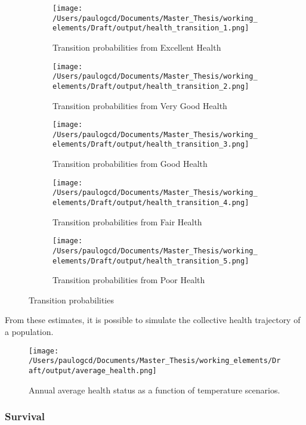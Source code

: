 \documentclass{article}
\begin{document}
\begin{figure}[H]
    \begin{subfigure}{.5\textwidth}
    \centering
    \texttt{[image: /Users/paulogcd/Documents/Master\_Thesis/working\_elements/Draft/output/health\_transition\_1.png]}
    \caption{Transition probabilities from Excellent Health}
    \label{fig:sfig1}
    \end{subfigure}%
    \begin{subfigure}{.5\textwidth}
    \centering
    \texttt{[image: /Users/paulogcd/Documents/Master\_Thesis/working\_elements/Draft/output/health\_transition\_2.png]}
    \caption{Transition probabilities from Very Good Health}
    \label{fig:sfig2}
    \end{subfigure}
    \begin{subfigure}{.5\textwidth}
    \centering
    \texttt{[image: /Users/paulogcd/Documents/Master\_Thesis/working\_elements/Draft/output/health\_transition\_3.png]}
    \caption{Transition probabilities from Good Health}
    \label{fig:sfig3}
    \end{subfigure}
    \begin{subfigure}{.5\textwidth}
    \centering
    \texttt{[image: /Users/paulogcd/Documents/Master\_Thesis/working\_elements/Draft/output/health\_transition\_4.png]}
    \caption{Transition probabilities from Fair Health}
    \label{fig:sfig4}
    \end{subfigure}
    \begin{subfigure}{.5\textwidth}
    \centering
    \texttt{[image: /Users/paulogcd/Documents/Master\_Thesis/working\_elements/Draft/output/health\_transition\_5.png]}
    \caption{Transition probabilities from Poor Health}
    \label{fig:sfig2}
    \end{subfigure}
    \caption{Transition probabilities }
\end{figure}

From these estimates, it is possible to simulate the collective 
health trajectory of a population.

\begin{figure}[H]
    \texttt{[image: /Users/paulogcd/Documents/Master\_Thesis/working\_elements/Draft/output/average\_health.png]}
    \caption{Annual average health status as a function of temperature scenarios.}
\end{figure}

\subsubsection{Survival}
\end{document}
